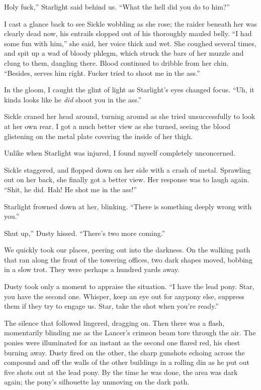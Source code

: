 \leavevmode{}Holy fuck,” Starlight said behind us. “What the hell did you do to him?”

I cast a glance back to see Sickle wobbling as she rose; the raider beneath her was clearly dead now, his entrails slopped out of his thoroughly mauled belly. “I had some fun with him,” she said, her voice thick and wet. She coughed several times, and spit up a wad of bloody phlegm, which struck the bars of her muzzle and clung to them, dangling there. Blood continued to dribble from her chin. “Besides, serves him right. Fucker tried to shoot me in the ass.”

In the gloom, I caught the glint of light as Starlight’s eyes changed focus. “Uh, it kinda looks like he \textit{did} shoot you in the ass.”

Sickle craned her head around, turning around as she tried unsuccessfully to look at her own rear. I got a much better view as she turned, seeing the blood glistening on the metal plate covering the inside of her thigh.

Unlike when Starlight was injured, I found myself completely unconcerned.

Sickle staggered, and flopped down on her side with a crash of metal. Sprawling out on her back, she finally got a better view. Her response was to laugh again. “Shit, he did. Hah! He shot me in the ass!”

Starlight frowned down at her, blinking. “There is something deeply wrong with you.”

\leavevmode{}Shut up,” Dusty hissed. “There’s two more coming.”

We quickly took our places, peering out into the darkness. On the walking path that ran along the front of the towering offices, two dark shapes moved, bobbing in a slow trot. They were perhaps a hundred yards away.

Dusty took only a moment to appraise the situation. “I have the lead pony. Star, you have the second one. Whisper, keep an eye out for anypony else, suppress them if they try to engage us. Star, take the shot when you’re ready.”

The silence that followed lingered, dragging on. Then there was a flash, momentarily blinding me as the Lancer’s crimson beam tore through the air. The ponies were illuminated for an instant as the second one flared red, his chest burning away. Dusty fired on the other, the sharp gunshots echoing across the compound and off the walls of the other buildings in a rolling din as he put out five shots out at the lead pony. By the time he was done, the area was dark again; the pony’s silhouette lay unmoving on the dark path.


